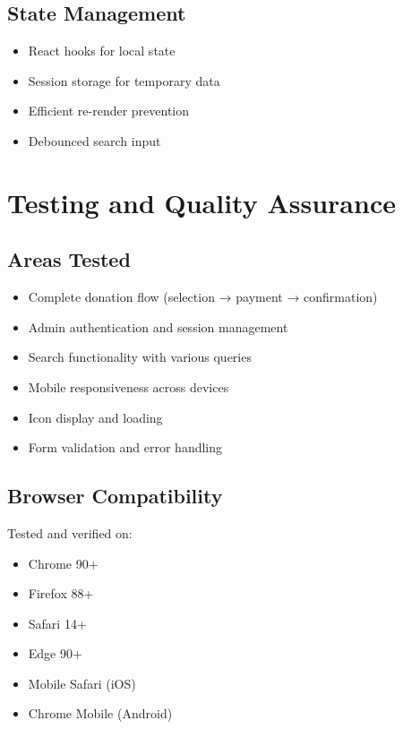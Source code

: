 \documentclass[11pt,a4paper]{article}
\begin{document}
\subsection{State Management}
\begin{itemize}[leftmargin=*,itemsep=5pt]
    \item React hooks for local state
    \item Session storage for temporary data
    \item Efficient re-render prevention
    \item Debounced search input
\end{itemize}

\section{Testing and Quality Assurance}

\subsection{Areas Tested}
\begin{itemize}[leftmargin=*,itemsep=5pt]
    \item Complete donation flow (selection → payment → confirmation)
    \item Admin authentication and session management
    \item Search functionality with various queries
    \item Mobile responsiveness across devices
    \item Icon display and loading
    \item Form validation and error handling
\end{itemize}

\subsection{Browser Compatibility}
Tested and verified on:
\begin{multicols}{2}
\begin{itemize}[leftmargin=*,itemsep=3pt]
    \item Chrome 90+
    \item Firefox 88+
    \item Safari 14+
    \item Edge 90+
    \item Mobile Safari (iOS)
    \item Chrome Mobile (Android)
\end{itemize}
\end{multicols}
\end{document}

